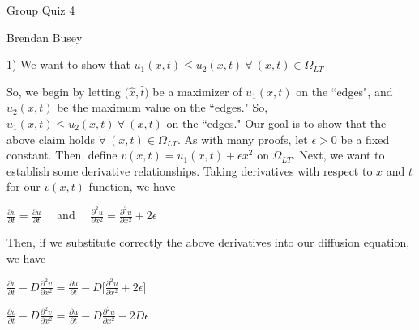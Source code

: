 \documentclass[executivepaper]{article}
\begin{document}
\vspace*{-40mm}

\begin{center}

Group Quiz 4

\end{center}

\begin{flushright}

Brendan Busey

\end{flushright}

\begin{flushleft}

1) We want to show that $u_{1}(x,t) \leq u_{2}(x,t) {~} \forall {~} (x,t) \in \Omega_{LT}$

\vspace{3mm}

So, we begin by letting $\Big(\hat{x}, \hat{t}\Big)$ be a maximizer of $u_{1}(x,t)$ on the ``edges", and $u_{2}(x,t)$ be the maximum value on the ``edges." So, $u_{1}(x,t) \leq u_{2}(x,t) {~} \forall {~} (x,t)$ on the ``edges." Our goal is to show that the above claim holds $\forall {~} (x,t) \in \Omega_{LT}$. As with many proofs, let $\epsilon > 0$ be a fixed constant. Then, define $v(x,t)=u_{1}(x,t)+\epsilon x^2$ on $\Omega_{LT}$. Next, we want to establish some derivative relationships. Taking derivatives with respect to $x$ and $t$ for our $v(x,t)$ function, we have

\begin{center}

$\frac{\partial v}{\partial t}=\frac{\partial u}{\partial t} \quad$ and $\quad \frac{\partial^2 u}{\partial x^2}=\frac{\partial^2 u}{\partial x^2}+2 \epsilon$

\end{center}

Then, if we substitute correctly the above derivatives into our diffusion equation, we have 

\begin{center}

$\frac{\partial v}{\partial t}-D\frac{\partial^2 v}{\partial x^2}=\frac{\partial u}{\partial t}-D\bigg[\frac{\partial^2 u}{\partial x^2}+2\epsilon\bigg]$

\vspace{3mm}

$\frac{\partial v}{\partial t}-D\frac{\partial^2 v}{\partial x^2}=\frac{\partial u}{\partial t}-D\frac{\partial^2 u}{\partial x^2}-2D\epsilon$


\end{center}
\end{flushleft}
\end{document}
